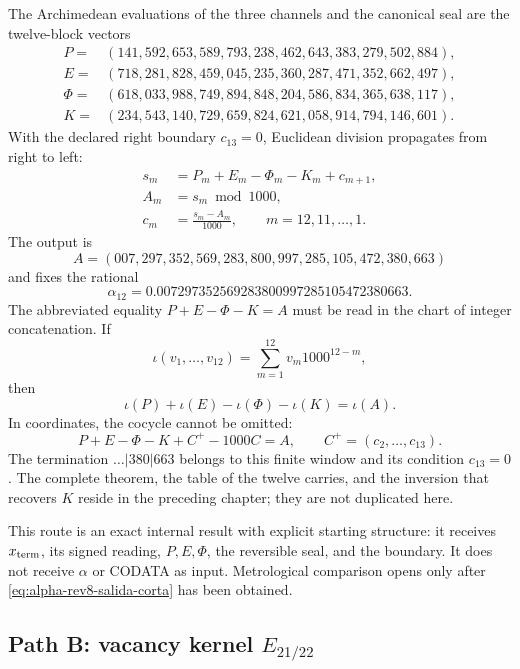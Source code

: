 The Archimedean evaluations of the three channels and the canonical seal are
the twelve-block vectors
\[
\begin{aligned}
P={}&(141,592,653,589,793,238,462,643,383,279,502,884),\\
E={}&(718,281,828,459,045,235,360,287,471,352,662,497),\\
\Phi={}&(618,033,988,749,894,848,204,586,834,365,638,117),\\
K={}&(234,543,140,729,659,824,621,058,914,794,146,601).
\end{aligned}
\]
With the declared right boundary \(c_{13}=0\), Euclidean division
propagates from right to left:
\begin{equation}
\begin{aligned}
 s_m&=P_m+E_m-\Phi_m-K_m+c_{m+1},\\
 A_m&=s_m\bmod 1000,\\
 c_m&=\frac{s_m-A_m}{1000},
 \qquad m=12,11,\ldots,1.
\end{aligned}
\label{eq:alpha-rev8-via-entera}
\end{equation}
The output is
\[
 A=(007,297,352,569,283,800,997,285,105,472,380,663)
\]
and fixes the rational
\begin{equation}
 \alpha_{12}
 =0.007297352569283800997285105472380663.
 \label{eq:alpha-rev8-salida-corta}
\end{equation}
The abbreviated equality \(P+E-\Phi-K=A\) must be read in the chart of
integer concatenation. If
\[
 \iota(v_1,\ldots,v_{12})
 =\sum_{m=1}^{12}v_m1000^{12-m},
\]
then
\begin{equation}
 \boxed{\iota(P)+\iota(E)-\iota(\Phi)-\iota(K)=\iota(A)}.
 \label{eq:alpha-rev8-identidad-concatenada}
\end{equation}
In coordinates, the cocycle cannot be omitted:
\[
 P+E-\Phi-K+C^+-1000C=A,
 \qquad C^+=(c_2,\ldots,c_{13}).
\]
The termination \(\ldots|380|663\) belongs to this finite window and its
condition \(c_{13}=0\). The complete theorem, the table of the twelve carries, and
the inversion that recovers \(K\) reside in the preceding chapter; they are not
duplicated here.

This route is an exact internal result with explicit starting structure:
it receives \(x_{\rm term}\), its signed reading, \(P,E,\Phi\), the reversible seal,
and the boundary. It does not receive \(\alpha\) or CODATA as input. Metrological
comparison opens only after \eqref{eq:alpha-rev8-salida-corta} has been obtained.

\subsection{Path B: vacancy kernel \texorpdfstring{\(E_{21/22}\)}{E21/22}}

